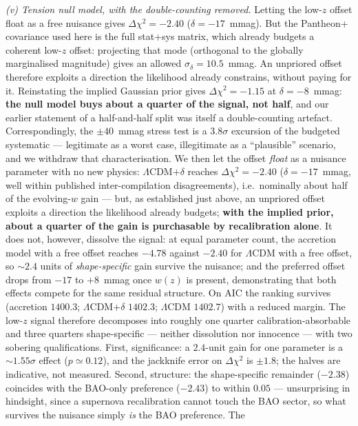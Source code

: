 \documentclass[11pt]{article}
\begin{document}
\emph{(v) Tension null model, with the double-counting removed.} Letting the low-$z$ offset float
as a free nuisance gives $\Delta\chi^2 = -2.40$ ($\delta = -17$~mmag). But the Pantheon+ covariance
used here is the full stat+sys matrix, which already budgets a coherent low-$z$ offset: projecting
that mode (orthogonal to the globally marginalised magnitude) gives an allowed
$\sigma_\delta = 10.5$~mmag. An unpriored offset therefore exploits a direction the likelihood
already constrains, without paying for it. Reinstating the implied Gaussian prior gives
$\Delta\chi^2 = -1.15$ at $\delta = -8$~mmag: \textbf{the null model buys about a quarter of the
signal, not half}, and our earlier statement of a half-and-half split was itself a double-counting
artefact. Correspondingly, the $\pm 40$~mmag stress test is a $3.8\sigma$ excursion of the budgeted
systematic --- legitimate as a worst case, illegitimate as a ``plausible'' scenario, and we
withdraw that characterisation. We then let the offset \emph{float} as a nuisance parameter with
no new physics: $\Lambda$CDM$+\delta$ reaches $\Delta\chi^2 = -2.40$ ($\delta = -17$~mmag, well within
published inter-compilation disagreements), i.e.\ nominally about half of the evolving-$w$ gain --- but, as established just above, an unpriored offset exploits a direction the likelihood already budgets; \textbf{with the implied prior, about a quarter of the gain is purchasable by recalibration alone}. It does not, however, dissolve the signal: at equal parameter count, the
accretion model with a free offset reaches $-4.78$ against $-2.40$ for $\Lambda$CDM with a free
offset, so $\sim 2.4$ units of \emph{shape-specific} gain survive the nuisance; and the preferred
offset drops from $-17$ to $+8$~mmag once $w(z)$ is present, demonstrating that both effects compete
for the same residual structure. On AIC the ranking survives (accretion $1400.3$; $\Lambda$CDM$+\delta$
$1402.3$; $\Lambda$CDM $1402.7$) with a reduced margin. The low-$z$ signal therefore decomposes into roughly one quarter calibration-absorbable and three quarters
shape-specific --- neither dissolution nor innocence --- with two sobering qualifications. First,
significance: a $2.4$-unit gain for one parameter is a $\sim 1.55\sigma$ effect ($p \simeq 0.12$),
and the jackknife error on $\Delta\chi^2$ is $\pm 1.8$; the halves are indicative, not measured.
Second, structure: the shape-specific remainder ($-2.38$) coincides with the BAO-only preference
($-2.43$) to within $0.05$ --- unsurprising in hindsight, since a supernova recalibration cannot
touch the BAO sector, so what survives the nuisance simply \emph{is} the BAO preference. The
\end{document}

